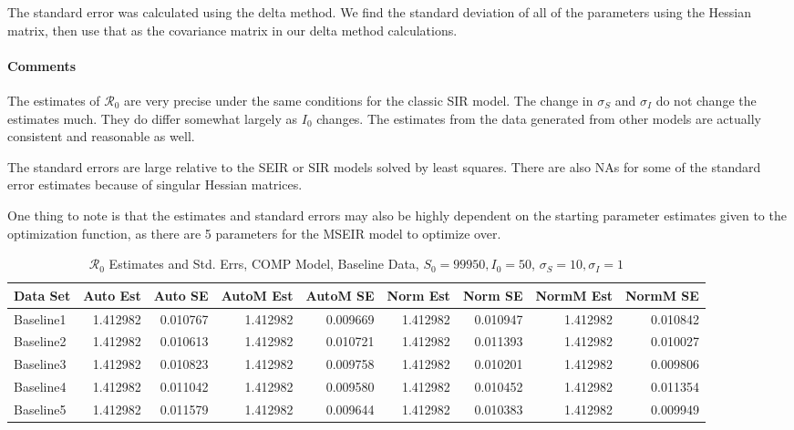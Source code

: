 \documentclass[12pt]{article}
\newcommand{\rr}{\ensuremath{\mathcal{R}_0}}
\begin{document}
The standard error was calculated using the delta method. We find the standard deviation of all of the parameters using the Hessian matrix, then use that as the covariance matrix in our delta method calculations.

\paragraph{Comments}

The estimates of $\rr$ are very precise under the same conditions for the classic SIR model. The change in $\sigma_S$ and $\sigma_I$ do not change the estimates much. They do differ somewhat largely as $I_0$ changes. The estimates from the data generated from other models are actually consistent and reasonable as well.

The standard errors are large relative to the SEIR or SIR models solved by least squares. There are also NAs for some of the standard error estimates because of singular Hessian matrices.

One thing to note is that the estimates and standard errors may also be highly dependent on the starting parameter estimates given to the optimization function, as there are 5 parameters for the MSEIR model to optimize over.

\begin{table}[H]
	
	\caption{$\rr$ Estimates and Std. Errs, COMP Model, 
		Baseline Data, $S_0 = 99950, I_0 = 50$, 
		$\sigma_S = 10, \sigma_I = 1$}
	\begin{footnotesize}
		\hskip -1cm
	\begin{tabular}{l|r|r|r|r|r|r|r|r}
		\hline
		Data Set & Auto Est & Auto SE & AutoM Est & AutoM SE & Norm Est & Norm SE & NormM Est & NormM SE\\
		\hline
		Baseline1 & 1.412982 & 0.010767 & 1.412982 & 0.009669 & 1.412982 & 0.010947 & 1.412982 & 0.010842\\
		\hline
		Baseline2 & 1.412982 & 0.010613 & 1.412982 & 0.010721 & 1.412982 & 0.011393 & 1.412982 & 0.010027\\
		\hline
		Baseline3 & 1.412982 & 0.010823 & 1.412982 & 0.009758 & 1.412982 & 0.010201 & 1.412982 & 0.009806\\
		\hline
		Baseline4 & 1.412982 & 0.011042 & 1.412982 & 0.009580 & 1.412982 & 0.010452 & 1.412982 & 0.011354\\
		\hline
		Baseline5 & 1.412982 & 0.011579 & 1.412982 & 0.009644 & 1.412982 & 0.010383 & 1.412982 & 0.009949\\
		\hline
	\end{tabular}
\end{footnotesize}
\end{table}
\end{document}
